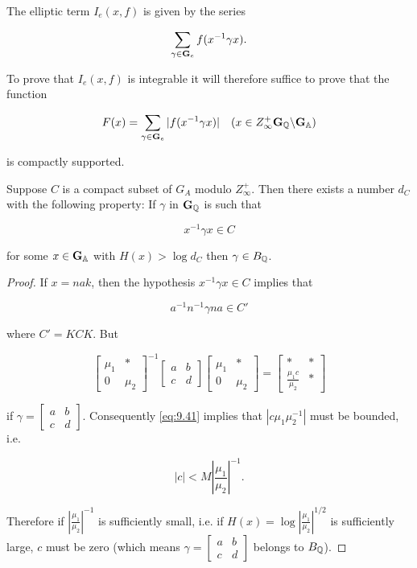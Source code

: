 The elliptic term $I_e(x,f)$ is given by the series

\[
\sum_{\gamma \in \mathbf{G}_e} f(x^{-1}\gamma x).
\]

To prove that $I_e(x,f)$ is integrable it will therefore suffice to prove that the function

\[
F(x) = \sum_{\gamma \in \mathbf{G}_e} |f(x^{-1}\gamma x)| \quad (x \in Z_\infty^{+}\mathbf{G}_{\mathbb{Q}} \backslash \mathbf{G}_{\mathbb{A}})
\]

is compactly supported.

\begin{lemma}\label{lem:9.9}

Suppose $C$ is a compact subset of $G_A$ modulo $Z_\infty^{+}$. Then there exists a number $d_C$ with the following property: If $\gamma$ in $\mathbf{G}_{\mathbb{Q}}$ is such that

\[
x^{-1}\gamma x \in C
\]

for some $x \in \mathbf{G}_{\mathbb{A}}$ with $H(x) > \log d_C$ then $\gamma \in B_{\mathbb{Q}}$.

\end{lemma}

\begin{proof}

If $x = nak$, then the hypothesis $x^{-1}\gamma x \in C$ implies that

\begin{equation}\label{eq:9.41}
a^{-1}n^{-1}\gamma na \in C'\tag{9.41}
\end{equation}

where $C' = KCK$. But

\[
\begin{bmatrix} \mu_1 & * \\ 0 & \mu_2 \end{bmatrix}^{-1}\begin{bmatrix} a & b \\ c & d \end{bmatrix}\begin{bmatrix} \mu_1 & * \\ 0 & \mu_2 \end{bmatrix} = \begin{bmatrix} * & * \\ \frac{\mu_1 c}{\mu_2} & * \end{bmatrix}
\]

if $\gamma = \begin{bmatrix} a & b \\ c & d \end{bmatrix}$. Consequently \eqref{eq:9.41} implies that $|c\mu_1\mu_2^{-1}|$ must be bounded, i.e.

\[
|c| < M\left|\frac{\mu_1}{\mu_2}\right|^{-1}.
\]

Therefore if $\left|\frac{\mu_1}{\mu_2}\right|^{-1}$ is sufficiently small, i.e. if $H(x) = \log\left|\frac{\mu_1}{\mu_2}\right|^{1/2}$ is sufficiently large, $c$ must be zero (which means $\gamma = \begin{bmatrix} a & b \\ c & d \end{bmatrix}$ belongs to $B_{\mathbb{Q}}$).

\end{proof}

